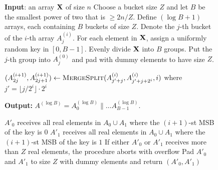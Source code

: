 \begin{figure*}[h!]
\centering

\begin{algorithm}
\begin{algorithmic}
\State
\State \textbf{Input}: an array $\mathbf{X}$ of size $n$
\State Choose a bucket size $Z$ and let $B$ be the smallest power of two that is $\geq 2n/Z$. 
\State Define $(\log B+1)$ arrays, each containing $B$ buckets of size $Z$. Denote the $j$-th bucket of the $i$-th array $A_j^{(i)}$.
\State For each element in $\mathbf{X}$, assign a uniformly random key in $[0,B-1]$.
\State Evenly divide $\mathbf{X}$ into $B$ groups. Put the $j$-th group into $A_j^{(0)}$ and pad with dummy elements to have size $Z$.

        \State $(A^{(i+1)}_{2j}, A^{(i+1)}_{2j+1}) \leftarrow \textsc{MergeSplit}(A^{(i)}_{j'+j}, A^{(i)}_{j'+j+2^i}, i)$ where $j'=\lfloor j / {2^i} \rfloor \cdot 2^{i}$ %
        \State {}
        
    \EndFor
\EndFor    
\State \textbf{Output:} $A^{(\log B)} = A_0^{(\log B)} \| \ldots A_{B-1}^{(\log B)}$.

\medskip
{}
    \State $A'_0$ receives all real elements in $A_0 \cup A_1$ where the $(i+1)$-st MSB of the key is $0$   
    \State $A'_1$ receives all real elements in $A_0 \cup A_1$ where the $(i+1)$-st MSB of the key is $1$
    \State If either $A'_0$ or $A'_1$ receives more than $Z$ real elements, the procedure aborts with {\sf overflow}
    \State Pad $A'_0$ and $A'_1$ to size $Z$ with dummy elements and return $(A'_0, A'_1)$
\EndFunction   
\end{algorithmic}
\label{code:obin}
\end{algorithm}

\end{figure*}
